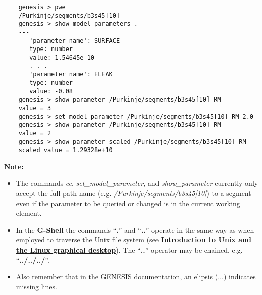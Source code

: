 \documentclass[12pt]{article}
\begin{document}
\begin{verbatim}
    genesis > pwe
    /Purkinje/segments/b3s45[10]
    genesis > show_model_parameters .
    ---
       'parameter name': SURFACE
       type: number
       value: 1.54645e-10
       . . .
       'parameter name': ELEAK
       type: number
       value: -0.08
    genesis > show_parameter /Purkinje/segments/b3s45[10] RM
    value = 3    
    genesis > set_model_parameter /Purkinje/segments/b3s45[10] RM 2.0
    genesis > show_parameter /Purkinje/segments/b3s45[10] RM
    value = 2
    genesis > show_parameter_scaled /Purkinje/segments/b3s45[10] RM
    scaled value = 1.29328e+10
\end{verbatim}

{\bf Note:}

\begin{itemize}
\item The commands {\it ce}, {\it set\_model\_parameter}, and {\it show\_parameter} currently only accept the full path name (e.g. {\it  /Purkinje/segments/b3s45[10]}) to a segment even if the parameter to be queried or changed is in the current working element. %

\item In the {\bf G-Shell} the commands ``{\bf .}'' and ``{\bf ..}'' operate in the same way as when employed to traverse the Unix file system (see \href{../unix-linux/unix-linux.tex}{\bf Introduction to Unix and the Linux graphical desktop}). The ``{\bf ..}'' operator may be chained, e.g. ``{\bf ../../../}''.

\item Also remember that in the GENESIS documentation, an elipsis ($\ldots$) indicates missing lines.

\end{itemize}
\end{document}

